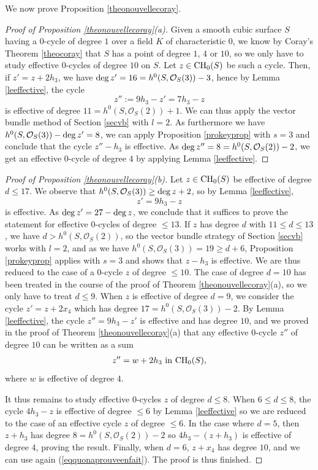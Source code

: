 \documentclass[10pt]{article}
\begin{document}
We now prove Proposition \ref{theonouvellecoray}.
\begin{proof}[Proof of Proposition \ref{theonouvellecoray}(a)] Given a smooth cubic surface $S$ having a $0$-cycle of degree $1$ over a field $K$ of characteristic $0$,  we know by Coray's Theorem \ref{theocoray} that $S$ has a point of degree $1,\,4$ or $10$, so we only have to study effective $0$-cycles  of degree $10$ on $S$.
Let $z\in {\rm CH}_0(S)$ be such a cycle. Then, if $z'=z+2h_3$, we have ${\rm deg}\,z'=16=h^0(S,\mathcal{O}_S(3))-3$, hence by Lemma \ref{leeffective}, the cycle
$$z'':=9h_3-z'=7h_3-z$$
is effective of degree $11=h^0(S,\mathcal{O}_S(2))+1$. We can thus apply the vector bundle method of Section \ref{secvb} with $l=2$.
As furthermore we have $h^0(S,\mathcal{O}_S(3))-{\rm deg}\,z'=8$, we can apply Proposition \ref{prokeyprop} with $s=3$ and conclude that
the cycle $z''-h_3$ is effective. As ${\rm deg}\,z''=8=h^0(S,\mathcal{O}_S(2))-2$, we get  an effective $0$-cycle of degree $4$ by applying Lemma \ref{leeffective}.
\end{proof}

\begin{proof}[Proof of Proposition \ref{theonouvellecoray}(b)] Let $z\in {\rm CH}_0(S)$ be effective of degree $d\leq 17$. We observe that $h^0(S,\mathcal{O}_S(3))\geq {\rm deg}\,z+2$, so by Lemma \ref{leeffective},
$$z'=9h_3-z$$
is effective. As ${\rm deg}\,z'=27-{\rm deg}\,z$,
we conclude that it suffices to prove the statement for effective $0$-cycles of degree $\leq 13$.
If $z$ has degree $d$ with $11\leq d\leq 13$, we have $d>h^0(S,\mathcal{O}_S(2))$, so the vector bundle strategy of Section \ref{secvb} works with $l=2$, and as we have $h^0(S,\mathcal{O}_S(3))=19\geq d+6$, Proposition \ref{prokeyprop} applies with $s=3$ and shows that $z-h_3$ is effective. We are thus reduced to the case of a $0$-cycle  $z$ of degree $\leq 10$. The case of degree $d=10$ has been treated in the course of the proof of Theorem \ref{theonouvellecoray}(a), so we only have to treat $d\leq 9$.
When $z$ is effective of degree $d=9$, we consider the cycle $z'=z+2x_4$ which has degree $17=h^0(S,\mathcal{O}_S(3))-2$. By Lemma \ref{leeffective}, the cycle $z''=9h_3-z'$ is effective and has degree $10$, and we proved in the proof of Theorem \ref{theonouvellecoray}(a) that any effective $0$-cycle $z''$ of degree $10$   can be written as a sum
\begin{eqnarray}\label{eqquonaprouveenfait} z''=w+2h_3\,\,{\rm in}\,\,{\rm CH}_0(S), \end{eqnarray}
 where $w$ is effective of degree $4$.

 It thus remains to study effective $0$-cycles $z$ of degree $d\leq 8$. When $6\leq d\leq 8$, the cycle
 $4h_3-z$ is effective of degree $\leq 6$ by Lemma \ref{leeffective} so we are reduced to the case of an effective cycle $z$ of degree $\leq 6$.
 In the case where $d=5$, then $z+h_3$ has degree $8=h^0(S,\mathcal{O}_S(2))-2$ so $4h_3-(z+h_3)$ is effective of degree $4$, proving the result. Finally, when $d=6$, $z+x_4$ has degree $10$, and we can use again (\ref{eqquonaprouveenfait}). The proof is thus finished.
 \end{proof}
\end{document}
